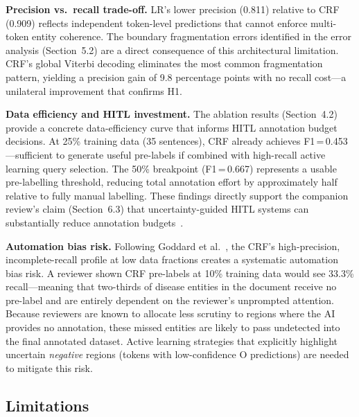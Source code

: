 \documentclass[sigconf,nonacm]{acmart}
\begin{document}
\textbf{Precision vs.\ recall trade-off.}
LR's lower precision (0.811) relative to CRF (0.909) reflects independent token-level predictions that cannot enforce multi-token entity coherence. The boundary fragmentation errors identified in the error analysis (Section~5.2) are a direct consequence of this architectural limitation. CRF's global Viterbi decoding eliminates the most common fragmentation pattern, yielding a precision gain of 9.8 percentage points with no recall cost---a unilateral improvement that confirms H1.

\textbf{Data efficiency and HITL investment.}
The ablation results (Section~4.2) provide a concrete data-efficiency curve that informs HITL annotation budget decisions. At 25\% training data (35 sentences), CRF already achieves F1\,=\,0.453---sufficient to generate useful pre-labels if combined with high-recall active learning query selection. The 50\% breakpoint (F1\,=\,0.667) represents a usable pre-labelling threshold, reducing total annotation effort by approximately half relative to fully manual labelling. These findings directly support the companion review's claim (Section~6.3) that uncertainty-guided HITL systems can substantially reduce annotation budgets~\cite{budd2021}.

\textbf{Automation bias risk.}
Following Goddard et al.~\cite{goddard2012}, the CRF's high-precision, incomplete-recall profile at low data fractions creates a systematic automation bias risk. A reviewer shown CRF pre-labels at 10\% training data would see 33.3\% recall---meaning that two-thirds of disease entities in the document receive no pre-label and are entirely dependent on the reviewer's unprompted attention. Because reviewers are known to allocate less scrutiny to regions where the AI provides no annotation, these missed entities are likely to pass undetected into the final annotated dataset. Active learning strategies that explicitly highlight uncertain \emph{negative} regions (tokens with low-confidence O predictions) are needed to mitigate this risk.

\subsection{Limitations}
\end{document}
